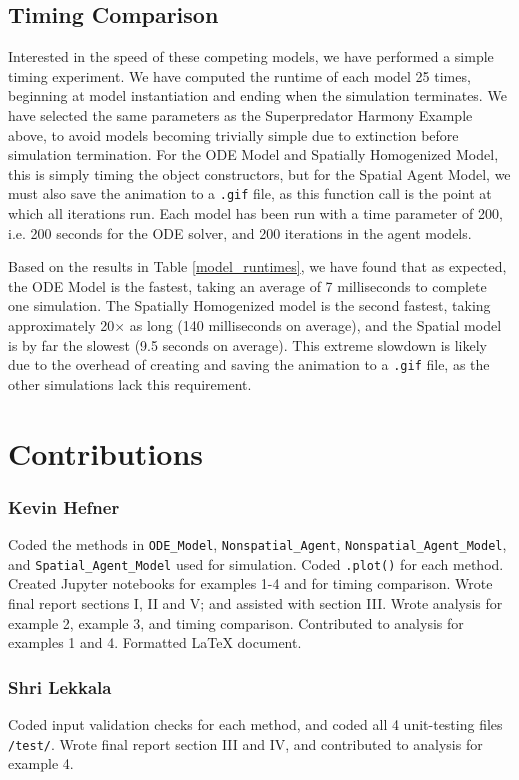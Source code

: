 \documentclass[journal]{IEEEtran}
\begin{document}
\newpage

\subsection{Timing Comparison}
Interested in the speed of these competing models, we have performed a simple timing experiment. We have computed the runtime of each model 25 times, beginning at model instantiation and ending when the simulation terminates. We have selected the same parameters as the Superpredator Harmony Example above, to avoid models becoming trivially simple due to extinction before simulation termination. For the ODE Model and Spatially Homogenized Model, this is simply timing the object constructors, but for the Spatial Agent Model, we must also save the animation to a \verb|.gif| file, as this function call is the point at which all iterations run. Each model has been run with a time parameter of 200, i.e. 200 seconds for the ODE solver, and 200 iterations in the agent models.\par
Based on the results in Table \ref{model_runtimes}, we have found that as expected, the ODE Model is the fastest, taking an average of 7 milliseconds to complete one simulation. The Spatially Homogenized model is the second fastest, taking approximately 20$\times$ as long (140 milliseconds on average), and the Spatial model is by far the slowest (9.5 seconds on average). This extreme slowdown is likely due to the overhead of creating and saving the animation to a \verb|.gif| file, as the other simulations lack this requirement.


\newpage

\section*{Contributions}
\subsubsection*{Kevin Hefner} Coded the methods in \verb|ODE_Model|, \verb|Nonspatial_Agent|, \verb|Nonspatial_Agent_Model|, and \verb|Spatial_Agent_Model| used for simulation. Coded \verb|.plot()| for each method. Created Jupyter notebooks for examples 1-4 and for timing comparison. Wrote final report sections I, II and V; and assisted with section III. Wrote analysis for example 2, example 3, and timing comparison. Contributed to analysis for examples 1 and 4. Formatted LaTeX document.

\subsubsection*{Shri Lekkala} Coded input validation checks for each method, and coded  all 4 unit-testing files \verb|/test/|. Wrote final report section III and IV, and contributed to analysis for example 4.
\end{document}
